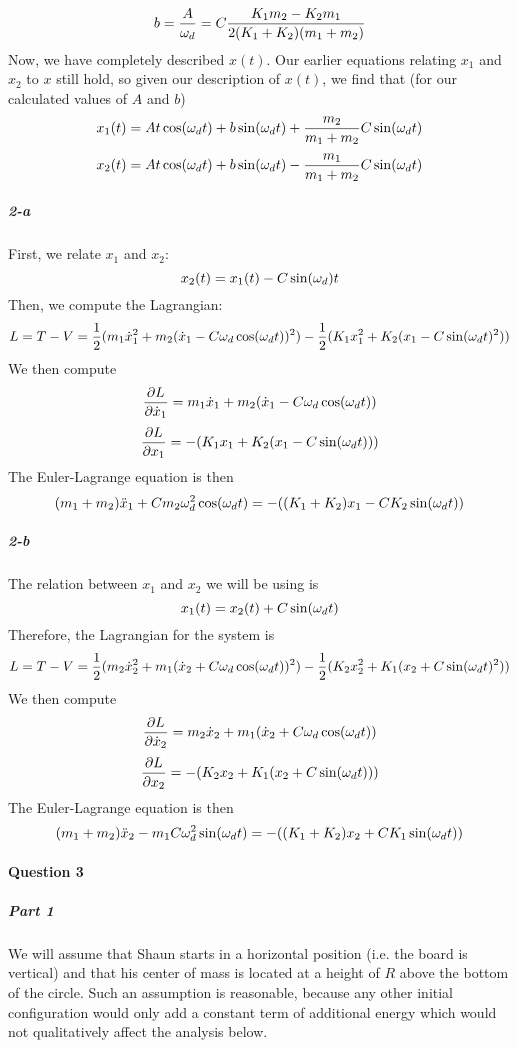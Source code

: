 $$b=\frac{A}{\omega_d}=C\frac{K_1 m_2-K_2 m_1}{2(K_1+K_2)(m_1+m_2)}$$
Now, we have completely described $x(t)$.  Our earlier equations relating $x_1$ and $x_2$ to $x$ still hold, so given our description of $x(t)$, we find that (for our calculated values of $A$ and $b$)
$$x_1(t)=At \cos(\omega_d t)+b\sin(\omega_d t)+\frac{m_2}{m_1+m_2} C\sin(\omega_d t)$$
$$x_2(t)=At\cos(\omega_d t)+b\sin(\omega_d t)-\frac{m_1}{m_1+m_2}C\sin(\omega_d t)$$
\subparagraph{2-a}  First, we relate $x_1$ and $x_2$:
$$x_2(t)= x_1(t)-C\sin(\omega_d) t$$
Then, we compute the Lagrangian:
$$L=T-V= \frac 1 2 (m_1 \dot x_1^2 + m_2 (\dot x_1 - C\omega_d \cos(\omega_d t))^2)-\frac 1 2 (K_1 x_1^2+K_2 (x_1-C \sin(\omega_d t)^2))$$
We then compute
$$\frac{\partial L}{\partial \dot x_1}= m_1 \dot x_1 + m_2 (\dot x_1 - C \omega_d \cos(\omega_d t))$$
$$\frac{\partial L}{\partial x_1}=-(K_1 x_1+K_2(x_1-C\sin (\omega_d t)))$$
The Euler-Lagrange equation is then 
$$  (m_1+m_2)\ddot x_1 + C m_2 \omega_d^2 \cos(\omega_d t)=-((K_1+K_2) x_1 - C K_2 \sin(\omega_d t))$$
\subparagraph{2-b}  The relation between $x_1$ and $x_2$ we will be using is
$$x_1(t)=x_2(t) + C\sin(\omega_d t)$$
Therefore, the Lagrangian for the system is 
$$L=T-V= \frac 1 2 (m_2 \dot x_2^2 + m_1 (\dot x_2 + C\omega_d \cos(\omega_d t))^2)-\frac 1 2 (K_2 x_2^2+K_1 (x_2+C \sin(\omega_d t)^2))$$
We then compute
$$\frac{\partial L}{\partial \dot x_2}= m_2 \dot x_2 + m_1 (\dot x_2+ C \omega_d \cos(\omega_d t))$$
$$\frac{\partial L}{\partial x_2}=-(K_2 x_2+K_1(x_2+C\sin (\omega_d t)))$$
The Euler-Lagrange equation is then
$$ (m_1+m_2) \ddot x_2-m_1 C \omega_d^2 \sin(\omega_d t)=-((K_1+K_2) x_2+C K_1 \sin(\omega_d t))$$

\paragraph{Question 3}
\subparagraph{Part 1}
We will assume that Shaun starts in a horizontal position (i.e. the board is vertical) and that his center of mass is located at a height of $R$ above the bottom of the circle. Such an assumption is reasonable, because any other initial configuration would only add a constant term of additional energy which would not qualitatively affect the analysis below.

